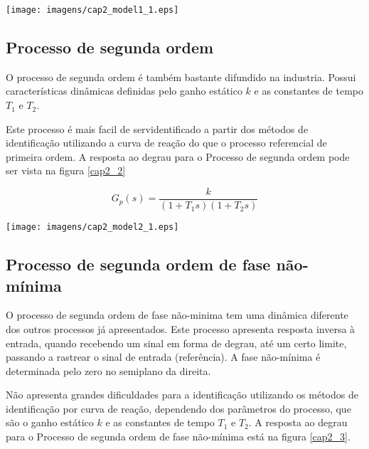     \begin{center}
        \texttt{[image: imagens/cap2\_model1\_1.eps]}
	\label{cap2_1}
    \end{center}

\subsection{Processo de segunda ordem}
    
    O processo de segunda ordem é também bastante difundido na industria. Possui
    características dinâmicas definidas pelo ganho estático $k$ e as constantes de
    tempo $T_1$ e $T_2$.
    
    Este processo é mais facil de servidentificado a partir dos métodos de
    identificação utilizando a curva de reação do que o processo referencial de
    primeira ordem. A resposta ao degrau para o Processo de segunda ordem pode
    ser vista na figura \ref{cap2_2}
    
    \begin{equation}
        G_p(s) = \frac{k}{(1+T_1 s)(1+T_2 s)}
    \end{equation}
    
    \begin{center}
        \texttt{[image: imagens/cap2\_model2\_1.eps]}
	\label{cap2_2}
    \end{center}

\subsection{Processo de segunda ordem de fase não-mínima}

    O processo de segunda ordem de fase não-minima tem uma dinâmica diferente dos
    outros processos já apresentados. Este processo apresenta resposta inversa à
    entrada, quando recebendo um sinal em forma de degrau, até um certo limite,
    passando a rastrear o sinal de entrada (referência). A fase não-mínima é
    determinada pelo zero no semiplano da direita.
    
    Não apresenta grandes dificuldades para a identificação utilizando os métodos
    de identificação por curva de reação, dependendo dos parâmetros do processo,
    que são o ganho estático $k$ e as constantes de tempo $T_1$ e $T_2$. A resposta
    ao degrau para o Processo de segunda ordem de fase não-mínima está na figura
    \ref{cap2_3}.

